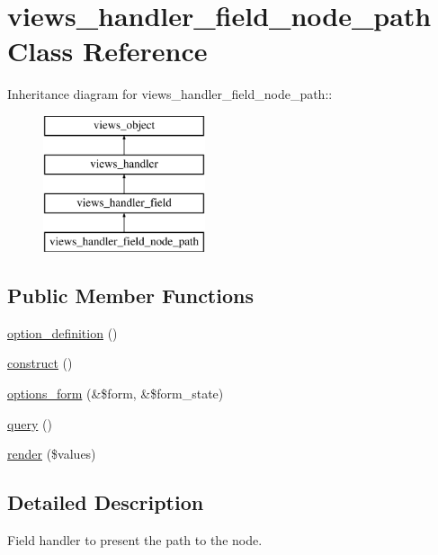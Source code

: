 \hypertarget{classviews__handler__field__node__path}{
\section{views\_\-handler\_\-field\_\-node\_\-path Class Reference}
\label{classviews__handler__field__node__path}
}
Inheritance diagram for views\_\-handler\_\-field\_\-node\_\-path::\begin{figure}[H]
\begin{center}
\leavevmode
\includegraphics[height=4cm]{classviews__handler__field__node__path}
\end{center}
\end{figure}
\subsection*{Public Member Functions}
\begin{CompactItemize}
\item 
\hyperlink{classviews__handler__field__node__path_90ca65d2d782d1f58ceee0c9d53f4d23}{option\_\-definition} ()
\item 
\hyperlink{classviews__handler__field__node__path_9f8110039f0e7f6bb87792c222c7fd06}{construct} ()
\item 
\hyperlink{classviews__handler__field__node__path_f0eb803f6004582da8a3b4aa9e81cedf}{options\_\-form} (\&\$form, \&\$form\_\-state)
\item 
\hyperlink{classviews__handler__field__node__path_59474fa6e78296b5f0c2aca6a951907e}{query} ()
\item 
\hyperlink{classviews__handler__field__node__path_94067b369f0f373515cae33ad940ae2f}{render} (\$values)
\end{CompactItemize}


\subsection{Detailed Description}
Field handler to present the path to the node. 

